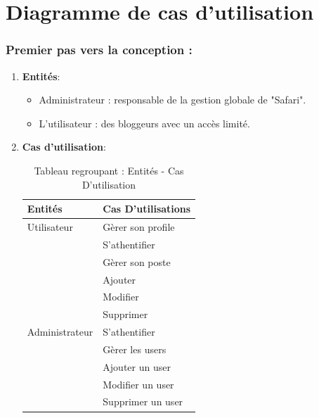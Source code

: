 

\section{Diagramme de cas d'utilisation}


\subsubsection{Premier pas vers la conception :}

\begin{enumerate}
    \item \textbf{Entités}:\\
    \begin{itemize}
        \item Administrateur : responsable de la gestion globale de "Safari".\\
        \item L'utilisateur : des bloggeurs avec un accès limité.\\
    \end{itemize}
    
    \item \textbf{Cas d'utilisation}:\\
    \renewcommand{\thefigure}{1}
    \renewcommand{\thetable}{1}
\begin{table}[htbp] %
    \centering
    
    \begin{tabular}{|l|l|}
        \hline
        \textbf{Entités} & \textbf{Cas D’utilisations}               \\ \hline
        Utilisateur   & Gèrer son profile                       \\
                         & S’athentifier                              \\
                         & Gèrer son poste \\ 
                         & Ajouter                                   \\
                         & Modifier                                  \\
                         & Supprimer                                 \\ \hline
        Administrateur    & S’athentifier                                                         \\
                         & Gèrer les users                 \\
                         & Ajouter un user                                   \\
                         & Modifier un user                                  \\
                         & Supprimer un user                                 \\ \hline
    \end{tabular}
    \caption{Tableau regroupant : Entités - Cas D'utilisation}
    \label{tab:entities_use_cases}
\end{table}


\end{enumerate}
